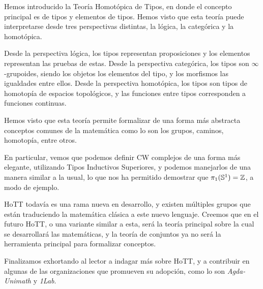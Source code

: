 \documentclass[../main.tex]{subfiles}
\begin{document}
Hemos introducido la Teor\'ia Homot\'opica de Tipos, en donde el concepto principal es de tipos y elementos de tipos.
Hemos visto que esta teor\'ia puede interpretarse desde tres perspectivas distintas, la l\'ogica, la categ\'orica y la homot\'opica.

Desde la perspectiva l\'ogica, los tipos representan proposiciones y los elementos representan las pruebas de estas.
Desde la perspectiva categ\'orica, los tipos son $\infty$-grupoides, siendo los objetos los elementos del tipo, y los morfismos las igualdades entre ellos.
Desde la perspectiva homot\'opica, los tipos son tipos de homotop\'ia de espacios topol\'ogicos, y las funciones entre tipos corresponden a funciones continuas.

Hemos visto que esta teor\'ia permite formalizar de una forma m\'as abstracta conceptos comunes de la matem\'atica como lo son los grupos, caminos, homotop\'ia, entre otros.

En particular, vemos que podemos definir CW complejos de una forma m\'as elegante, utilizando Tipos Inductivos Superiores, y podemos manejarlos de una manera similar a la usual, lo que nos ha permitido demostrar que $\pi_1(\mathbb{S}^1)=\mathbb{Z}$, a modo de ejemplo.

HoTT todav\'ia es una rama nueva en desarrollo, y existen m\'ultiples grupos que est\'an traduciendo la matem\'atica cl\'asica a este nuevo lenguaje.
Creemos que en el futuro HoTT, o una variante similar a esta, ser\'a la teor\'ia principal sobre la cual se desarrollar\'a las matem\'aticas, y la teor\'ia de conjuntos ya no ser\'a la herramienta principal para formalizar conceptos.

Finalizamos exhortando al lector a indagar m\'as sobre HoTT, y a contribuir en algunas de las organizaciones que promueven su adopci\'on, como lo son \textit{Agda-Unimath} y \textit{1Lab}.
\end{document}
